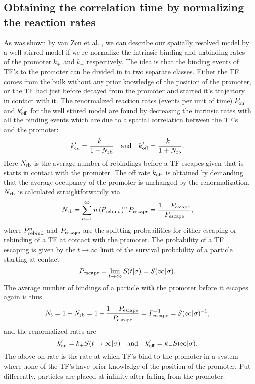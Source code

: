 \subsection{Obtaining the correlation time by normalizing the reaction rates}
As was shown by van Zon et al. \cite{VanZon2006}, we can describe our spatially resolved model by a well stirred model if we re-normalize the intrinsic binding and unbinding rates of the promoter $k_+$ and $k_-$ respectively. The idea is that the binding events of TF's to the promoter can be divided in to two separate classes. Either the TF comes from the bulk without any prior knowledge of the position of the promoter, or the TF had just before decayed from the promoter and started it's trajectory in contact with it. The renormalized reaction rates (events per unit of time) $k'_{\rm on}$ and $k'_{\rm off}$ for the well stirred model are found by decreasing the intrinsic rates with all the binding events which are due to a spatial correlation between the TF's and the promoter:
\begin{equation}
 k'_{\rm on} = \frac{k_+}{1 + N_{\rm rb}} \quad \text{and} \quad k'_{\rm off} = \frac{k_-}{1 + N_{\rm rb}}.
\end{equation}
Here $N_{\rm rb}$ is the average number of rebindings before a TF escapes given that is starts in contact with the promoter. The off rate $k_{\rm off}$ is obtained by demanding that the average occupancy of the promoter is unchanged by the renormalization. $N_{\rm rb}$ is calculated straightforwardly via
\begin{equation}
 N_{\rm rb} = \sum_{n=1}^{\infty} n \left( P_{\rm rebind} \right)^n P_{\rm escape} = \frac{1-P_{\rm escape}}{P_{\rm escape}},
\end{equation}
where $P_{\rm rebind}^n$ and $P_{\rm escape}$ are the splitting probabilities for either escaping or rebinding of a TF at contact with the promoter. The probability of a TF escaping is given by the $t \rightarrow \infty$ limit of the survival probability of a particle starting at contact 
\begin{equation}
 P_{\rm escape} = \lim_{t \rightarrow \infty} S(t|\sigma) = S(\infty|\sigma).
\end{equation}
The average number of bindings of a particle with the promoter before it escapes again is thus
\begin{equation}
 N_b = 1 + N_{\rm rb} = 1 + \frac{1 - P_{\rm escape}}{P_{\rm escape}} = P_{\rm escape}^{-1} = S(\infty|\sigma)^{-1},
\end{equation}
and the renormalized rates are
\begin{equation}
 k'_{\rm on} = k_+ S(t \rightarrow \infty|\sigma) \quad \text{and} \quad  k'_{\rm off} = k_- S(\infty|\sigma).
 \elabel{RenRates}
\end{equation}
The above on-rate is the rate at which TF's bind to the promoter in a system where none of the TF's have prior knowledge of the position of the promoter. Put differently, particles are placed at infinity after falling from the promoter. 

